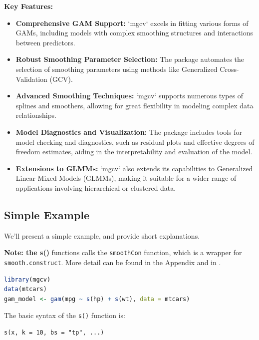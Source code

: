 \documentclass[12pt, twoside,hidelinks]{article}
\theoremstyle{definition}
\numberwithin{equation}{section}
\begin{document}
\textbf{Key Features:}
\begin{itemize}
    \item \textbf{Comprehensive GAM Support:} `mgcv` excels in fitting various forms of GAMs, including models with complex smoothing structures and interactions between predictors.
    
    \item \textbf{Robust Smoothing Parameter Selection:} The package automates the selection of smoothing parameters using methods like Generalized Cross-Validation (GCV).
    
    \item \textbf{Advanced Smoothing Techniques:} `mgcv` supports numerous types of splines and smoothers, allowing for great flexibility in modeling complex data relationships.
    
    \item \textbf{Model Diagnostics and Visualization:} The package includes tools for model checking and diagnostics, such as residual plots and effective degrees of freedom estimates, aiding in the interpretability and evaluation of the model.
    
    \item \textbf{Extensions to GLMMs:} `mgcv` also extends its capabilities to Generalized Linear Mixed Models (GLMMs), making it suitable for a wider range of applications involving hierarchical or clustered data.
\end{itemize}

\subsection{Simple Example}

We'll present a simple example, and provide short explanations.

\textbf{Note: the s()} functions calls the \texttt{smoothCon} function, which is a wrapper for \texttt{smooth.construct}. More detail can be found in the Appendix and in \cite{wood2017}.

\begin{lstlisting}[language=R]
library(mgcv)
data(mtcars)
gam_model <- gam(mpg ~ s(hp) + s(wt), data = mtcars)

\end{lstlisting}

The basic syntax of the \texttt{s()} function is:

\begin{verbatim}
s(x, k = 10, bs = "tp", ...)
\end{verbatim}
\end{document}
